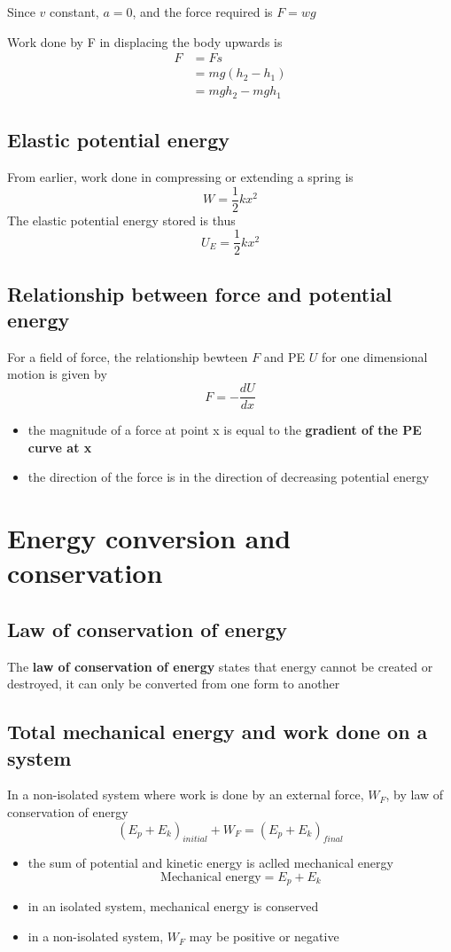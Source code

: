 \documentclass[a4paper, 10pt]{article}
\begin{document}
Since $v$ constant, $a = 0$, and the force required is $F = wg$ 

Work done by F in displacing the body upwards is
\begin{align*}
   F &= Fs \\
     &= mg(h_2 - h_1) \\
     &= mgh_2 - mgh_1
\end{align*}	

\subsection{Elastic potential energy}
From earlier, work done in compressing or extending a spring is 
\[
W = \frac{1}{2}kx^2
\]
The elastic potential energy stored is thus
\[
   U_E = \frac{1}{2}kx^2
\]


\subsection{Relationship between force and potential energy}
For a field of force, the relationship bewteen $F$ and PE $U$ for one dimensional motion is given by 
\[
   F = - \frac{dU}{dx}
\]
\begin{itemize}
   \item the magnitude of a force at point x is equal to the \textbf{gradient of the PE curve at x}
   \item the direction of the force is in the direction of decreasing potential energy
\end{itemize}	


\section{Energy conversion and conservation}
\subsection{Law of conservation of energy}
\begin{framed}
   The \textbf{law of conservation of energy} states that energy cannot be created or destroyed, it can only be converted from one form to another
\end{framed}	

\subsection{Total mechanical energy and work done on a system}
In a non-isolated system where work is done by an external force, $W_F$, by law of conservation of energy
\[
   (E_p + E_k)_{initial} + W_F = (E_p + E_k)_{final} 
\]
\begin{itemize}
   \item the sum of potential and kinetic energy is aclled mechanical energy
      \[
         \text{Mechanical energy} = E_p + E_k
      \]
   \item in an isolated system, mechanical energy is conserved
   \item in a non-isolated system, $W_F$ may be positive or negative
\end{itemize}	
\end{document}
